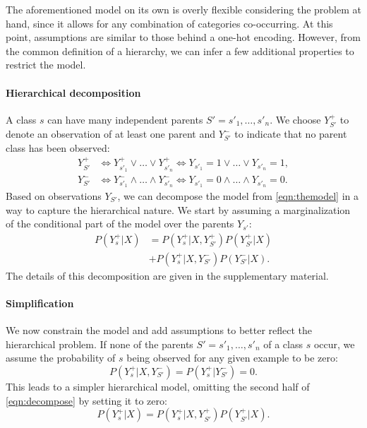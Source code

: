 \documentclass[10pt,twocolumn,letterpaper]{article}
\begin{document}
The aforementioned model on its own is overly flexible considering the problem at hand, since
it allows for any combination of categories co-occurring. At this point, assumptions are similar
to those behind a one-hot encoding.
However, from the common definition of a hierarchy, we can infer a few additional properties to restrict the model.

\paragraph{Hierarchical decomposition}
A class $s$ can have many independent parents $S'=s'_1,\ldots,s'_n$. We choose $Y_{S'}^+$ to denote
an observation of at least one parent and $Y_{S'}^-$ to indicate that no parent class
has been observed:
\begin{eqnarray*}
Y_{S'}^+ & \Leftrightarrow Y_{s'_1}^+ \vee \ldots \vee Y_{s'_n}^+   \Leftrightarrow Y_{s'_1}=1 \vee \ldots \vee Y_{s'_n}=1,\\
Y_{S'}^- & \Leftrightarrow Y_{s'_1}^- \land \ldots \land Y_{s'_n}^- \Leftrightarrow Y_{s'_1}=0 \land \ldots \land Y_{s'_n}=0.
\end{eqnarray*}
Based on observations $Y_{S'}$, we can decompose the model from \cref{eqn:themodel}
in a way to capture the hierarchical nature. We start by assuming a marginalization
of the conditional part of the model over the parents $Y_{s'}$:
\begin{equation}
\begin{split}
P(Y_s^+|X) &= P(Y_s^+|X, Y_{S'}^+)P(Y_{S'}^+|X)\\
&+ P(Y_s^+|X, Y_{S'}^-)P(Y_{S'}^-|X).
\end{split}
\label{eqn:decompose}
\end{equation}
The details of this decomposition are given in the supplementary material.

\paragraph{Simplification}
We now constrain the model and add assumptions to better reflect the hierarchical problem.
If none of the parents $S'=s'_1,\ldots,s'_n$ of a class $s$ occur, we assume the
probability of $s$ being observed for any given example to be zero:
\begin{equation}
P(Y_s^+ | X, Y_{S'}^-) = P(Y_s^+ | Y_{S'}^-) = 0.
\label{eqn:hcritzero}
\end{equation}
This leads to a simpler hierarchical model, omitting the second half of \cref{eqn:decompose}
by setting it to zero:
\begin{equation}
P(Y_s^+|X) = P(Y_s^+|X, Y_{S'}^+)P(Y_{S'}^+|X).
\end{equation}
\end{document}

